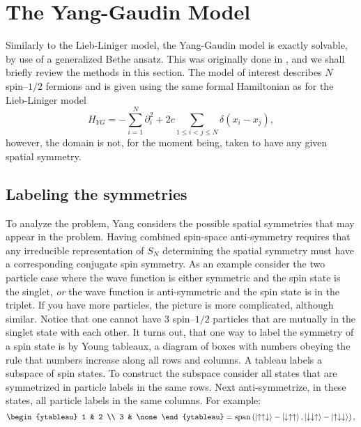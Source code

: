 \section{The Yang-Gaudin Model}
\label{SectionYG}
Similarly to the Lieb-Liniger model, the Yang-Gaudin model is exactly solvable, by use of a generalized Bethe ansatz. This was originally done in \cite{yang1967some}, and we shall briefly review the methods in this section.
The model of interest describes $ N $ spin--$ 1/2 $ fermions and is given using the same formal Hamiltonian as for the Lieb-Liniger model\begin{equation}\label{EqYGHamiltonian}
H_{YG}=-\sum_{i=1}^{N}\partial_i^2+2c\sum_{1\leq i<j\leq N}\delta(x_i-x_j),
\end{equation}
however, the domain is not, for the moment being, taken to have any given spatial symmetry. 
\subsection{Labeling the symmetries}
To analyze the problem, Yang considers the possible spatial symmetries that may appear in the problem. Having combined spin-space anti-symmetry requires that any irreducible representation of $ S_N$ determining the spatial symmetry must have a corresponding conjugate spin symmetry. As an example consider the two particle case where the wave function is either symmetric and the spin state is the singlet, \emph{or} the wave function is anti-symmetric and the spin state is in the triplet. If you have more particles, the picture is more complicated, although similar. Notice that one cannot have $ 3 $ spin--$ 1/2 $ particles that are mutually in the singlet state with each other. It turns out, that one way to label the symmetry of a spin state is by Young tableaux, \ie a diagram of boxes with numbers obeying the rule that numbers increase along all rows and columns. A tableau labels a subspace of spin states. To construct the subspace consider all states that are symmetrized in particle labels in the same rows. Next anti-symmetrize, in these states, all particle labels in the same columns. For example: \begin{equation}
\begin{ytableau}
1 & 2 \\
3 &  \none 
\end{ytableau}=\Span{\ket{\uparrow \uparrow \downarrow }-\ket{\downarrow \uparrow \uparrow},\ket{\downarrow\downarrow\uparrow}-\ket{\uparrow\downarrow\downarrow}},
\end{equation}

